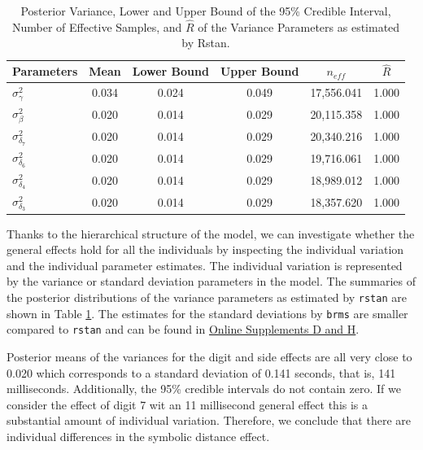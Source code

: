 \documentclass[
  english,
  doc,floatsintext]{apa6}
\begin{document}
\begin{table}[h]

\begin{center}
\begin{threeparttable}

\caption{\label{tab:inddevtable}Posterior Variance, Lower and Upper Bound of the 95\% Credible Interval, Number of Effective Samples, and $\hat{R}$ of the Variance Parameters as estimated by Rstan.}

\begin{tabular}{lccccc}
\toprule
Parameters & \multicolumn{1}{c}{Mean} & \multicolumn{1}{c}{Lower Bound} & \multicolumn{1}{c}{Upper Bound} & \multicolumn{1}{c}{$n_{eff}$} & \multicolumn{1}{c}{$\hat{R}$}\\
\midrule
$\sigma_{\gamma}^2$ & 0.034 & 0.024 & 0.049 & 17,556.041 & 1.000\\
$\sigma_{\beta}^2$ & 0.020 & 0.014 & 0.029 & 20,115.358 & 1.000\\
$\sigma_{\delta_{7}}^2$ & 0.020 & 0.014 & 0.029 & 20,340.216 & 1.000\\
$\sigma_{\delta_{6}}^2$ & 0.020 & 0.014 & 0.029 & 19,716.061 & 1.000\\
$\sigma_{\delta_{4}}^2$ & 0.020 & 0.014 & 0.029 & 18,989.012 & 1.000\\
$\sigma_{\delta_{3}}^2$ & 0.020 & 0.014 & 0.029 & 18,357.620 & 1.000\\
\bottomrule
\end{tabular}

\end{threeparttable}
\end{center}

\end{table}

Thanks to the hierarchical structure of the model, we can investigate whether the general effects hold for all the individuals by inspecting the individual variation and the individual parameter estimates. The individual variation is represented by the variance or standard deviation parameters in the model. The summaries of the posterior distributions of the variance parameters as estimated by \texttt{rstan} are shown in Table \ref{tab:inddevtable}. The estimates for the standard deviations by \texttt{brms} are smaller compared to \texttt{rstan} and can be found in \href{https://github.com/MyrtheV/Bayesian-Hierarchical-Modelling-An-Introduction-and-Reassessment}{Online Supplements D and H}.

Posterior means of the variances for the digit and side effects are all very close to 0.020 which corresponds to a standard deviation of 0.141 seconds, that is, 141 milliseconds. Additionally, the 95\% credible intervals do not contain zero. If we consider the effect of digit 7 wit an 11 millisecond general effect this is a substantial amount of individual variation. Therefore, we conclude that there are individual differences in the symbolic distance effect.
\end{document}
